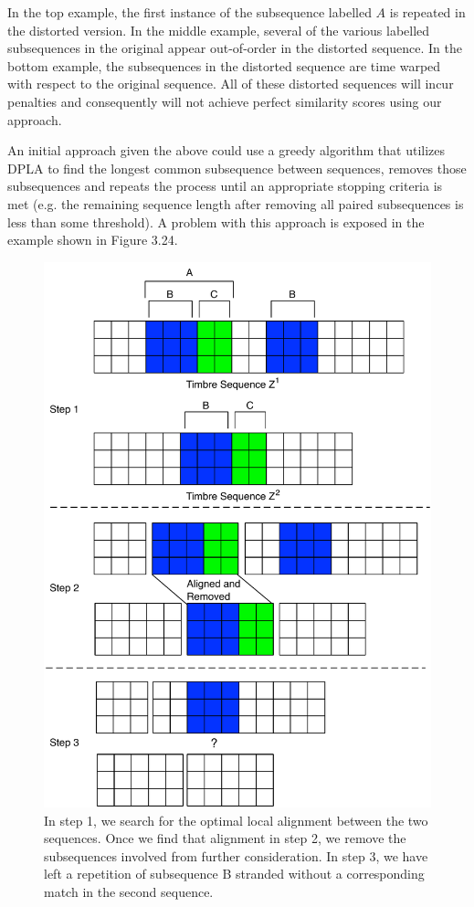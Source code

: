 \documentclass[12pt]{report} 	%
\numberwithin{figure}{chapter}
\numberwithin{table}{chapter}
\numberwithin{equation}{chapter}
\begin{document}
\begin{flushleft}
In the top example, the first instance of the subsequence labelled $A$ is repeated in the distorted version. In the middle example, several of the various labelled subsequences in the original appear out-of-order in the distorted sequence. In the bottom example, the subsequences  in the distorted sequence are time warped with respect to the original sequence. All of these distorted sequences will incur penalties and consequently will not achieve perfect similarity scores using our approach.

An initial approach given the above could use a greedy algorithm that utilizes DPLA to find the longest common subsequence between sequences, removes those subsequences and repeats the process until an appropriate stopping criteria is met (e.g. the remaining sequence length after removing all paired subsequences is less than some threshold). A problem with this approach is exposed in the example shown in Figure 3.24. 
\begin{figure}[!p]
\begin{center}
\includegraphics[scale=0.6]{GreedyMatching1}
\caption[Symmetric greedy removal after matching]{In step 1, we search for the optimal local alignment between the two sequences. Once we find that alignment in step 2, we remove the subsequences involved from further consideration. In step 3, we have left a repetition of subsequence B stranded without a corresponding match in the second sequence.}
\end{center}
\end{figure}


\end{flushleft}
\end{document}
